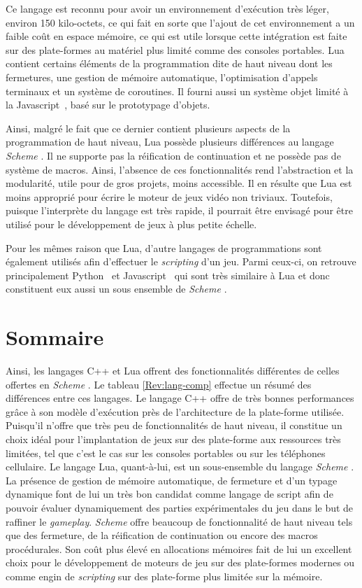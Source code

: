 \documentclass[12pt,twoside,letterpaper,francais]{book}
\newcommand{\Schemelang}{{\textit{Scheme }}}
\begin{document}
Ce langage est reconnu pour avoir un environnement d'exécution très
léger, environ 150 kilo-octets, ce qui fait en sorte que l'ajout de
cet environnement a un faible coût en espace mémoire, ce qui est utile
lorsque cette intégration est faite sur des plate-formes au matériel
plus limité comme des consoles portables. Lua contient certains
éléments de la programmation dite de haut niveau dont les fermetures,
une gestion de mémoire automatique, l'optimisation d'appels terminaux
et un système de coroutines. Il fourni aussi un système objet limité à
la Javascript~\cite{ECMA-262}, basé sur le prototypage d'objets.

Ainsi, malgré le fait que ce dernier contient plusieurs aspects de la
programmation de haut niveau, Lua possède plusieurs différences au
langage \Schemelang. Il ne supporte pas la réification de continuation et
ne possède pas de système de macros. Ainsi, l'absence de ces
fonctionnalités rend l'abstraction et la modularité, utile pour de
gros projets, moins accessible. Il en résulte que Lua est moins
approprié pour écrire le moteur de jeux vidéo non triviaux. Toutefois,
puisque l'interprète du langage est très rapide, il pourrait être
envisagé pour être utilisé pour le développement de jeux à plus petite
échelle.

Pour les mêmes raison que Lua, d'autre langages de programmations sont
également utilisés afin d'effectuer le \textit{scripting} d'un
jeu. Parmi ceux-ci, on retrouve principalement Python~\cite{Python} et
Javascript~\cite{ECMA-262} qui sont très similaire à Lua et donc
constituent eux aussi un sous ensemble de \Schemelang.


\FloatBarrier
\section{Sommaire}
Ainsi, les langages C++ et Lua offrent des fonctionnalités différentes
de celles offertes en \Schemelang. Le tableau \ref{Rev:lang-comp} effectue
un résumé des différences entre ces langages. Le langage C++ offre de
très bonnes performances grâce à son modèle d'exécution près de
l'architecture de la plate-forme utilisée. Puisqu'il n'offre que très
peu de fonctionnalités de haut niveau, il constitue un choix idéal
pour l'implantation de jeux sur des plate-forme aux ressources très
limitées, tel que c'est le cas sur les consoles portables ou sur les
téléphones cellulaire. Le langage Lua, quant-à-lui, est un
sous-ensemble du langage \Schemelang. La présence de gestion de mémoire
automatique, de fermeture et d'un typage dynamique font de lui un très
bon candidat comme langage de script afin de pouvoir évaluer
dynamiquement des parties expérimentales du jeu dans le but de
raffiner le \textit{gameplay}. \Schemelang offre beaucoup de fonctionnalité
de haut niveau tels que des fermeture, de la réification de
continuation ou encore des macros procédurales. Son coût plus élevé en
allocations mémoires fait de lui un excellent choix pour le
développement de moteurs de jeu sur des plate-formes modernes ou comme
engin de \textit{scripting} sur des plate-forme plus limitée sur la
mémoire.
\end{document}
